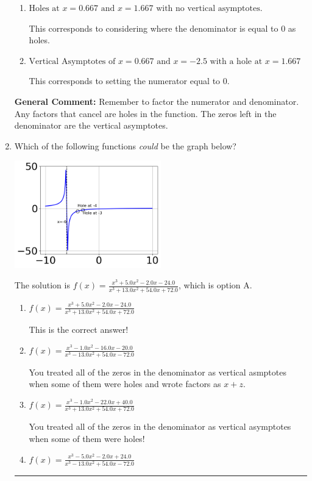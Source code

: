 \documentclass{extbook}[14pt]
\newcommand{\litem}[1]{\item #1

\rule{\textwidth}{0.4pt}}
\begin{document}
\begin{enumerate}
{\begin{enumerate}[label=\Alph*.]
This is the correct answer.
\item \( \text{Holes at } x = 0.667 \text{ and } x = 1.667 \text{ with no vertical asymptotes.} \)

This corresponds to considering where the denominator is equal to 0 as holes.
\item \( \text{Vertical Asymptotes of } x = 0.667 \text{ and } x = -2.5 \text{ with a hole at } x = 1.667 \)

This corresponds to setting the numerator equal to 0.
\end{enumerate}

\textbf{General Comment:} Remember to factor the numerator and denominator. Any factors that cancel are holes in the function. The zeros left in the denominator are the vertical asymptotes.
}
\litem{
Which of the following functions \textit{could} be the graph below?

\begin{center}
    \includegraphics[width=0.5\textwidth]{../Figures/identifyGraphOfRationalFunctionCopyC.png}
\end{center}


The solution is \( f(x)=\frac{x^{3} +5.0 x^{2} -2.0 x -24.0}{x^{3} +13.0 x^{2} +54.0 x + 72.0} \), which is option A.\begin{enumerate}[label=\Alph*.]
\item \( f(x)=\frac{x^{3} +5.0 x^{2} -2.0 x -24.0}{x^{3} +13.0 x^{2} +54.0 x + 72.0} \)

This is the correct answer!
\item \( f(x)=\frac{x^{3} -1.0 x^{2} -16.0 x -20.0}{x^{3} -13.0 x^{2} +54.0 x -72.0} \)

You treated all of the zeros in the denominator as vertical asmptotes when some of them were holes and wrote factors as $x+z$.
\item \( f(x)=\frac{x^{3} -1.0 x^{2} -22.0 x + 40.0}{x^{3} +13.0 x^{2} +54.0 x + 72.0} \)

You treated all of the zeros in the denominator as vertical asymptotes when some of them were holes!
\item \( f(x)=\frac{x^{3} -5.0 x^{2} -2.0 x + 24.0}{x^{3} -13.0 x^{2} +54.0 x -72.0} \)


\end{enumerate}}
\end{enumerate}
\end{document}

